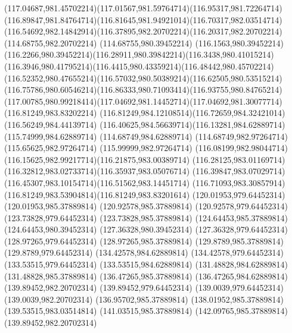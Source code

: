 {{	\curveto(117.04687,981.45702214)(117.01567,981.59764714)(116.95317,981.72264714)
	\curveto(116.89847,981.84764714)(116.81645,981.94921014)(116.70317,982.03514714)
	\curveto(116.54692,982.14842914)(116.37895,982.20702214)(116.20317,982.20702214)
	\lineto(114.68755,982.20702214)
	\lineto(114.68755,980.39452214)
	\lineto(116.1563,980.39452214)
	\curveto(116.2266,980.39452214)(116.28911,980.39842214)(116.3438,980.41015214)
	\curveto(116.3946,980.41795214)(116.4415,980.43359214)(116.48442,980.45702214)
	\curveto(116.52352,980.47655214)(116.57032,980.50389214)(116.62505,980.53515214)
	\curveto(116.75786,980.60546214)(116.86333,980.71093414)(116.93755,980.84765214)
	\curveto(117.00785,980.99218414)(117.04692,981.14452714)(117.04692,981.30077714)
	\closepath
	\moveto(116.81249,983.83202214)
	\curveto(116.81249,984.12108514)(116.72659,984.32421014)(116.56249,984.44139714)
	\curveto(116.40625,984.56639714)(116.13281,984.62889714)(115.74999,984.62889714)
	\lineto(114.68749,984.62889714)
	\lineto(114.68749,982.97264714)
	\lineto(115.65625,982.97264714)
	\lineto(115.99999,982.97264714)
	\curveto(116.08199,982.98044714)(116.15625,982.99217714)(116.21875,983.00389714)
	\curveto(116.28125,983.01169714)(116.32812,983.02733714)(116.35937,983.05076714)
	\curveto(116.39847,983.07029714)(116.45307,983.10154714)(116.51562,983.14451714)
	\curveto(116.71093,983.30857914)(116.81249,983.53904814)(116.81249,983.83201614)
	\closepath
	\moveto(120.01953,979.64452314)
	\lineto(120.01953,985.37889814)
	\lineto(120.92578,985.37889814)
	\lineto(120.92578,979.64452314)
	\closepath
	\moveto(123.73828,979.64452314)
	\lineto(123.73828,985.37889814)
	\lineto(124.64453,985.37889814)
	\lineto(124.64453,980.39452314)
	\lineto(127.36328,980.39452314)
	\lineto(127.36328,979.64452314)
	\closepath
	\moveto(128.97265,979.64452314)
	\lineto(128.97265,985.37889814)
	\lineto(129.8789,985.37889814)
	\lineto(129.8789,979.64452314)
	\closepath
	\moveto(134.42578,984.62889814)
	\lineto(134.42578,979.64452314)
	\lineto(133.53515,979.64452314)
	\lineto(133.53515,984.62889814)
	\lineto(131.48828,984.62889814)
	\lineto(131.48828,985.37889814)
	\lineto(136.47265,985.37889814)
	\lineto(136.47265,984.62889814)
	\closepath
	\moveto(139.89452,982.20702314)
	\lineto(139.89452,979.64452314)
	\lineto(139.0039,979.64452314)
	\lineto(139.0039,982.20702314)
	\lineto(136.95702,985.37889814)
	\lineto(138.01952,985.37889814)
	\lineto(139.53515,983.03514814)
	\lineto(141.03515,985.37889814)
	\lineto(142.09765,985.37889814)
	\closepath
	\moveto(139.89452,982.20702314)
}
}

{
}

